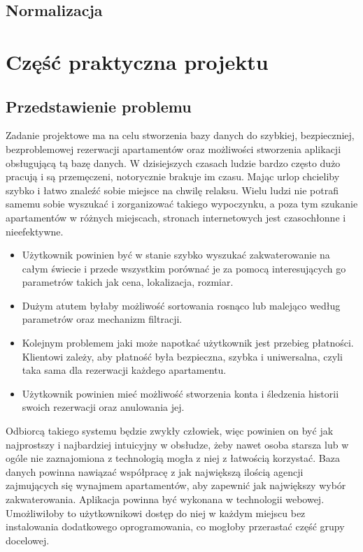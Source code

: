 \documentclass[polish, 11pt]{article}
\begin{document}
  		
    

    \subsection{Normalizacja}

\section{Część praktyczna projektu}
    \subsection{Przedstawienie problemu}
    Zadanie projektowe ma na celu stworzenia bazy danych do szybkiej, bezpieczniej, bezproblemowej rezerwacji apartamentów oraz możliwości stworzenia
    aplikacji obsługującą tą bazę danych. 
    W dzisiejszych czasach ludzie bardzo często dużo pracują i są przemęczeni, notorycznie brakuje im czasu. Mając urlop chcieliby szybko
    i łatwo znaleźć sobie miejsce na chwilę relaksu. Wielu ludzi nie potrafi samemu sobie wyszukać i zorganizować takiego wypoczynku, a poza tym
    szukanie apartamentów w różnych miejscach, stronach internetowych jest czasochłonne i nieefektywne.
	\begin{itemize}
     \item Użytkownik powinien być w stanie szybko wyszukać zakwaterowanie na całym świecie i przede wszystkim porównać je za pomocą interesujących go 			 parametrów takich jak cena, lokalizacja, rozmiar.
     \item Dużym atutem byłaby możliwość sortowania rosnąco lub malejąco według parametrów oraz mechanizm filtracji.
     \item Kolejnym problemem jaki może napotkać użytkownik jest przebieg płatności. Klientowi zależy, aby płatność była bezpieczna, szybka i uniwersalna,
     czyli taka sama dla rezerwacji każdego apartamentu.
     \item Użytkownik powinien mieć możliwość stworzenia konta i śledzenia historii swoich rezerwacji oraz
     anulowania jej.
    \end{itemize}    
    Odbiorcą takiego systemu będzie zwykły człowiek, więc powinien on być jak najprostszy i najbardziej intuicyjny w obsłudze, 
    żeby nawet osoba starsza lub w ogóle nie zaznajomiona z technologią mogła z niej z łatwością korzystać. Baza danych powinna nawiązać 
    współpracę z jak największą ilością agencji zajmujących się wynajmem apartamentów, aby zapewnić jak największy wybór zakwaterowania.  
    Aplikacja powinna być wykonana w technologii webowej. Umożliwiłoby to użytkownikowi dostęp do niej w każdym miejscu bez
    instalowania dodatkowego oprogramowania, co mogłoby przerastać część grupy docelowej.
       
\end{document}
